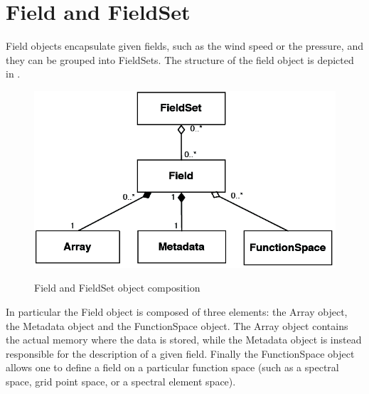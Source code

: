 \section{Field and FieldSet}
Field objects encapsulate given fields, such as the wind speed 
or the pressure, and they can be grouped into FieldSets. 
The structure of the field object is depicted in .
%
\begin{figure}
\centering
\includegraphics[scale=0.25]{imgs/field.png}
\label{fig:field}
\caption{Field and FieldSet object composition}
\end{figure}
%
In particular the Field object is composed of three elements:
the Array object, the Metadata object and the FunctionSpace 
object. The Array object contains the actual memory where the 
data is stored, while the Metadata object is instead responsible 
for the description of a given field. Finally the FunctionSpace
object allows one to define a field on a particular function 
space (such as a spectral space, grid point space, or a spectral 
element space).


 
